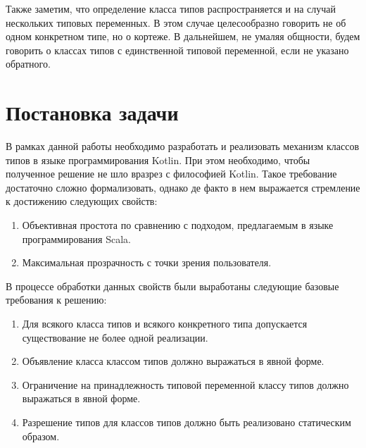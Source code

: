 Также заметим, что определение класса типов распространяется и на случай нескольких типовых переменных. В этом случае целесообразно говорить не об одном конкретном типе, но о кортеже. В дальнейшем, не умаляя общности, будем говорить о классах типов с единственной типовой переменной, если не указано обратного.


\section{Постановка задачи \label{sct:problem-constraints}}

В рамках данной работы необходимо разработать и реализовать механизм классов типов в языке программирования Kotlin. При этом необходимо, чтобы полученное решение не шло вразрез с философией Kotlin. Такое требование достаточно сложно формализовать, однако де факто в нем выражается стремление к достижению следующих свойств:
\begin{enumerate}
    \item \label{it:rp-01} Объективная простота по сравнению с подходом, предлагаемым в языке программирования Scala.
    \item \label{it:rp-02} Максимальная прозрачность с точки зрения пользователя.
\end{enumerate} 
В процессе обработки данных свойств были выработаны следующие базовые требования к решению: 
\begin{enumerate}
    \item Для всякого класса типов и всякого конкретного типа допускается существование не более одной реализации.
    \item Объявление класса классом типов должно выражаться в явной форме.
    \item Ограничение на принадлежность типовой переменной классу типов должно выражаться в явной форме.
    \item Разрешение типов для классов типов должно быть реализовано статическим образом. 
\end{enumerate}

